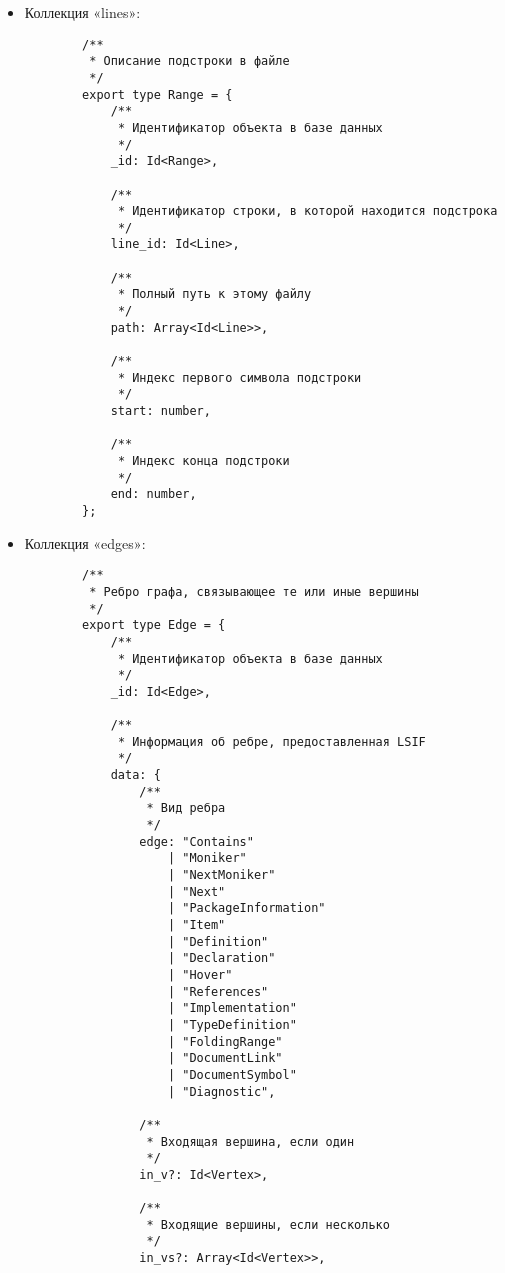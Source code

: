 \begin{itemize}
    \item Коллекция «lines»:
        \begin{verbatim}
        /**
         * Описание подстроки в файле
         */
        export type Range = {
            /**
             * Идентификатор объекта в базе данных
             */
            _id: Id<Range>,
            
            /**
             * Идентификатор строки, в которой находится подстрока
             */
            line_id: Id<Line>,
            
            /**
             * Полный путь к этому файлу
             */
            path: Array<Id<Line>>,
            
            /**
             * Индекс первого символа подстроки
             */
            start: number,
            
            /**
             * Индекс конца подстроки
             */
            end: number,
        };
        \end{verbatim}
    
    \item Коллекция «edges»:
        \begin{verbatim}
        /**
         * Ребро графа, связывающее те или иные вершины
         */
        export type Edge = {
            /**
             * Идентификатор объекта в базе данных
             */
            _id: Id<Edge>,
            
            /**
             * Информация об ребре, предоставленная LSIF
             */
            data: {
                /**
                 * Вид ребра
                 */
                edge: "Contains"
                    | "Moniker"
                    | "NextMoniker"
                    | "Next"
                    | "PackageInformation"
                    | "Item"
                    | "Definition"
                    | "Declaration"
                    | "Hover"
                    | "References"
                    | "Implementation"
                    | "TypeDefinition"
                    | "FoldingRange"
                    | "DocumentLink"
                    | "DocumentSymbol"
                    | "Diagnostic",
                    
                /**
                 * Входящая вершина, если один
                 */
                in_v?: Id<Vertex>,
                
                /**
                 * Входящие вершины, если несколько
                 */
                in_vs?: Array<Id<Vertex>>,
                

\end{verbatim}
\end{itemize}
